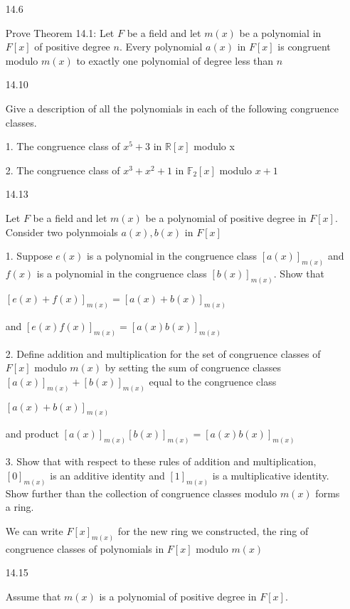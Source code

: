 \documentclass[12pt]{article}
\begin{document}
\begin{itemize}

\newpage 
\item[14.6]

	Prove Theorem 14.1: Let $F$ be a field and let $m(x)$ be a polynomial in $F[x]$ of positive degree $n$. Every polynomial $a(x)$ in $F[x]$ is congruent modulo $m(x)$ to exactly one polynomial of degree less than $n$

	

\newpage 
\item[14.10]

	Give a description of all the polynomials in each of the following congruence classes.

		1. The congruence class of $x^5 + 3$ in $\mathbb{R}[x]$ modulo x

		2. The congruence class of $x^3 + x^2 + 1$ in $\mathbb{F}_2[x]$ modulo $x+1$

\newpage 
\item[14.13]

	Let $F$ be a field and let $m(x)$ be a polynomial of positive degree in $F[x]$. Consider two polynmoials $a(x), b(x)$ in $F[x]$

		1. Suppose $e(x)$ is a polynomial in the congruence class $[a(x)]_{m(x)}$ and $f(x)$ is a polynomial in the congruence class $[b(x)]_{m(x)}$. Show that 

		$[e(x) + f(x)]_{m(x)} = [a(x) + b(x)]_{m(x)}$

		and $[e(x)f(x)]_{m(x)} = [a(x)b(x)]_{m(x)}$

		2. Define addition and multiplication for the set of congruence classes of $F[x]$ modulo $m(x)$ by setting the sum of congruence classes $[a(x)]_{m(x)} + [b(x)]_{m(x)}$ equal to the congruence class

		$[a(x) + b(x)]_{m(x)}$

		and product $[a(x)]_{m(x)}[b(x)]_{m(x)} = [a(x)b(x)]_{m(x)}$

		3. Show that with respect to these rules of addition and multiplication, $[0]_{m(x)}$ is an additive identity and $[1]_{m(x)}$ is a multiplicative identity. Show further than the collection of congruence classes modulo $m(x)$ forms a ring.

		We can write $F[x]_{m(x)}$ for the new ring we constructed, the ring of congruence classes of polynomials in $F[x]$ modulo $m(x)$
	
\newpage 
\item[14.15]

	Assume that $m(x)$ is a polynomial of positive degree in $F[x]$.


\end{itemize}
\end{document}

